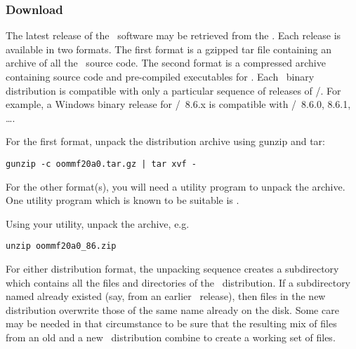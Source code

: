 \subsubsection{Download}

The latest release of the \OOMMF\ software may be retrieved from the
.  Each release is
available in two formats.  The first format is a gzipped tar file
containing an archive of all the \OOMMF\ source code.  The second format
is a  compressed archive containing source code and
pre-compiled executables for \Windows.  Each \Windows\ binary
distribution is compatible with only a particular sequence of releases
of \Tcl/\Tk.  For example, a Windows binary release for \Tcl/\Tk\ 8.6.x
is compatible with \Tcl/\Tk\ 8.6.0, 8.6.1, \ldots.  

For the first format, unpack the distribution archive using gunzip and
tar:
\begin{verbatim}
gunzip -c oommf20a0.tar.gz | tar xvf -
\end{verbatim}

For the other format(s), you will need a utility program to unpack the
 archive.  
One utility program which is known to be suitable is
.

Using your utility, unpack the  archive, e.g.
\begin{verbatim}
unzip oommf20a0_86.zip
\end{verbatim}

For either distribution format, the unpacking sequence creates a
subdirectory  which contains all the files and directories
of the \OOMMF\ distribution.  If a subdirectory named 
already existed (say, from an earlier \OOMMF\ release), then
files in the new distribution overwrite those of the same name already
on the disk.  Some care may be needed in that circumstance to be
sure that the resulting mix of files from an old and a new 
\OOMMF\ distribution combine to create a working set of files.

